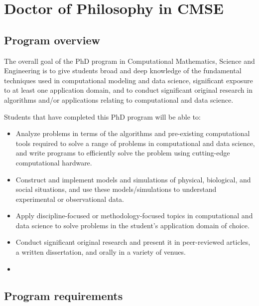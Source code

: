 \section{Doctor of Philosophy in CMSE}
\label{sec:phd}

\subsection{Program overview}
\label{sec:phd_overview}

The overall goal of the PhD program in Computational Mathematics,
Science and Engineering is to give students broad and deep knowledge
of the fundamental techniques used in computational modeling and data
science, significant exposure to at least one application domain, and
to conduct significant original research in algorithms and/or
applications relating to computational and data science.

\vspace{2mm}
\noindent
Students that have completed this PhD program will be able to:

\begin{itemize}
\item  Analyze problems in terms of the algorithms and pre-existing
  computational tools required to solve a range of problems in
  computational and data science, and write programs to efficiently
  solve the problem using cutting-edge computational hardware.  

\item  Construct and implement models and simulations of physical,
  biological, and social situations, and use these models/simulations
  to understand experimental or observational data.  

\item  Apply discipline-focused or methodology-focused topics in
  computational and data science to solve problems in the student’s
  application domain of choice.

\item  Conduct significant original research and present it in
  peer-reviewed articles, a written dissertation, and orally in a
  variety of venues.  

\item   {}

\end{itemize}


\subsection{Program requirements}
\label{sec:phd_requirements}

